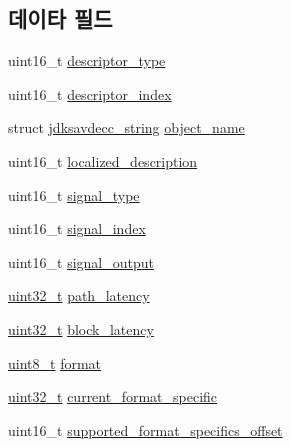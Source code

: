 \subsection*{데이타 필드}
\begin{DoxyCompactItemize}
\item 
uint16\+\_\+t \hyperlink{structjdksavdecc__descriptor__video__unit__cluster_ab7c32b6c7131c13d4ea3b7ee2f09b78d}{descriptor\+\_\+type}
\item 
uint16\+\_\+t \hyperlink{structjdksavdecc__descriptor__video__unit__cluster_a042bbc76d835b82d27c1932431ee38d4}{descriptor\+\_\+index}
\item 
struct \hyperlink{structjdksavdecc__string}{jdksavdecc\+\_\+string} \hyperlink{structjdksavdecc__descriptor__video__unit__cluster_a7d1f5945a13863b1762fc6db74fa8f80}{object\+\_\+name}
\item 
uint16\+\_\+t \hyperlink{structjdksavdecc__descriptor__video__unit__cluster_a0926f846ca65a83ad5bb06b4aff8f408}{localized\+\_\+description}
\item 
uint16\+\_\+t \hyperlink{structjdksavdecc__descriptor__video__unit__cluster_a248e60ef99d5ed1779989d1dd6b6dc5a}{signal\+\_\+type}
\item 
uint16\+\_\+t \hyperlink{structjdksavdecc__descriptor__video__unit__cluster_ae2e81a95ee9ad83f1fe22b6a1ee29075}{signal\+\_\+index}
\item 
uint16\+\_\+t \hyperlink{structjdksavdecc__descriptor__video__unit__cluster_ab4b91864e6fc335d7e86536d9f4461e4}{signal\+\_\+output}
\item 
\hyperlink{parse_8c_a6eb1e68cc391dd753bc8ce896dbb8315}{uint32\+\_\+t} \hyperlink{structjdksavdecc__descriptor__video__unit__cluster_a5527ea1fa3f885e9d2264e450e1635fa}{path\+\_\+latency}
\item 
\hyperlink{parse_8c_a6eb1e68cc391dd753bc8ce896dbb8315}{uint32\+\_\+t} \hyperlink{structjdksavdecc__descriptor__video__unit__cluster_ae2e9f0088d5e900b610d1b2818dfc559}{block\+\_\+latency}
\item 
\hyperlink{stdint_8h_aba7bc1797add20fe3efdf37ced1182c5}{uint8\+\_\+t} \hyperlink{structjdksavdecc__descriptor__video__unit__cluster_a7864fd50d470f893524181b4a59d9828}{format}
\item 
\hyperlink{parse_8c_a6eb1e68cc391dd753bc8ce896dbb8315}{uint32\+\_\+t} \hyperlink{structjdksavdecc__descriptor__video__unit__cluster_a63f65131cfbe03bc516880e297be3181}{current\+\_\+format\+\_\+specific}
\item 
uint16\+\_\+t \hyperlink{structjdksavdecc__descriptor__video__unit__cluster_a4f27294c624ea8ade0df5e53def07e00}{supported\+\_\+format\+\_\+specifics\+\_\+offset}

\end{DoxyCompactItemize}
